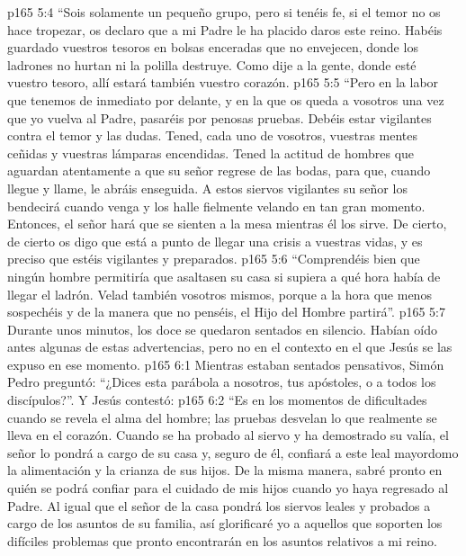 \vs p165 5:4 “Sois solamente un pequeño grupo, pero si tenéis fe, si el temor no os hace tropezar, os declaro que a mi Padre le ha placido daros este reino. Habéis guardado vuestros tesoros en bolsas enceradas que no envejecen, donde los ladrones no hurtan ni la polilla destruye. Como dije a la gente, donde esté vuestro tesoro, allí estará también vuestro corazón.
\vs p165 5:5 “Pero en la labor que tenemos de inmediato por delante, y en la que os queda a vosotros una vez que yo vuelva al Padre, pasaréis por penosas pruebas. Debéis estar vigilantes contra el temor y las dudas. Tened, cada uno de vosotros, vuestras mentes ceñidas y vuestras lámparas encendidas. Tened la actitud de hombres que aguardan atentamente a que su señor regrese de las bodas, para que, cuando llegue y llame, le abráis enseguida. A estos siervos vigilantes su señor los bendecirá cuando venga y los halle fielmente velando en tan gran momento. Entonces, el señor hará que se sienten a la mesa mientras él los sirve. De cierto, de cierto os digo que está a punto de llegar una crisis a vuestras vidas, y es preciso que estéis vigilantes y preparados.
\vs p165 5:6 “Comprendéis bien que ningún hombre permitiría que asaltasen su casa si supiera a qué hora había de llegar el ladrón. Velad también vosotros mismos, porque a la hora que menos sospechéis y de la manera que no penséis, el Hijo del Hombre partirá”.
\vs p165 5:7 \pc Durante unos minutos, los doce se quedaron sentados en silencio. Habían oído antes algunas de estas advertencias, pero no en el contexto en el que Jesús se las expuso en ese momento.
\vs p165 6:1 Mientras estaban sentados pensativos, Simón Pedro preguntó: “¿Dices esta parábola a nosotros, tus apóstoles, o a todos los discípulos?”. Y Jesús contestó:
\vs p165 6:2 \pc “Es en los momentos de dificultades cuando se revela el alma del hombre; las pruebas desvelan lo que realmente se lleva en el corazón. Cuando se ha probado al siervo y ha demostrado su valía, el señor lo pondrá a cargo de su casa y, seguro de él, confiará a este leal mayordomo la alimentación y la crianza de sus hijos. De la misma manera, sabré pronto en quién se podrá confiar para el cuidado de mis hijos cuando yo haya regresado al Padre. Al igual que el señor de la casa pondrá los siervos leales y probados a cargo de los asuntos de su familia, así glorificaré yo a aquellos que soporten los difíciles problemas que pronto encontrarán en los asuntos relativos a mi reino.
